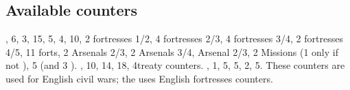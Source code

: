 \subsection{Available counters}
\ARMY, 6\FLEET, 3\corsaire, 15\LDND, 5\LD, 4\NTD,
10\LDENDE, 2 fortresses 1/2, 4 fortresses 2/3, 4 fortresses 3/4, 2
fortresses 4/5, 11 forts, 2 Arsenals 2/3, 2 Arsenals 3/4, Arsenal  2/3,
2 Missions (1 only if not ), 5
 \LD (and 3  \LDE).
\COL, 10\TP, 14\MNU, 18\TradeFLEET, 4\ROTW treaty
counters.
\ARMY, 1\FLEET, 5\LDND, 5\LD, 2\NTD, 5\LDENDE. These
counters are used for English civil wars; the  uses
English fortresses counters.

